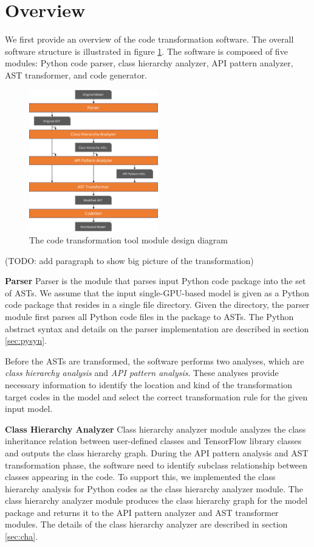 \section{Overview}

We first provide an overview of the code transformation software.
The overall software structure is illustrated in figure \ref{sysarch}.
The software is composed of five modules: Python code parser,
class hierarchy analyzer, API pattern analyzer, AST transformer,
and code generator.

\begin{figure}[ht!]
  \centering
  \includegraphics[width=0.5\textwidth]{tool-arch.pdf}
  \caption{The code transformation tool module design diagram}
  \label{sysarch}
\end{figure}

(TODO: add paragraph to show big picture of the transformation)

\textbf{Parser}
Parser is the module that parses input Python code package
into the set of ASTs.
We assume that the input single-GPU-based model is given as a Python code
package that resides in a single file directory.
Given the directory, the parser module first parses all Python code files
in the package to ASTs.
The Python abstract syntax and details on the parser implementation
are described in section \ref{sec:pysyn}.

Before the ASTs are transformed, the software performs two analyses, 
which are \textit{class hierarchy analysis} and 
\textit{API pattern analysis}.
These analyses provide necessary information to identify the
location and kind of the transformation target codes in the model
and select the correct transformation rule for the given input model.

\textbf{Class Hierarchy Analyzer}
Class hierarchy analyzer module analyzes the class inheritance relation
between user-defined classes and TensorFlow library classes and
outputs the class hierarchy graph.
During the API pattern analysis and AST transformation phase,
the software need to identify subclass relationship between
classes appearing in the code.
To support this, we implemented the class hierarchy analysis
for Python codes as the class hierarchy analyzer module.
The class hierarchy analyzer module produces the class hierarchy graph
for the model package and returns it to the API pattern analyzer and 
AST transformer modules. The details of the class hierarchy analyzer are
described in section \ref{sec:cha}.

